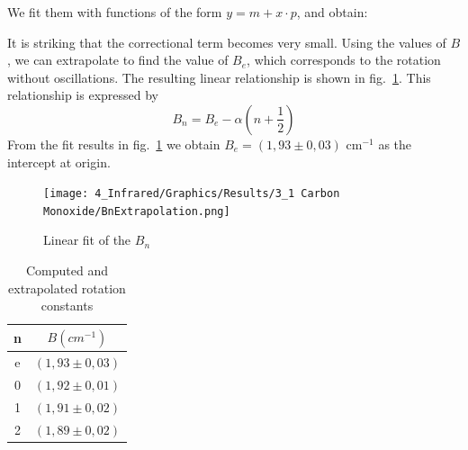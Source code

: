 \documentclass[12pt]{article}
\begin{document}
We fit them with functions of the form $y = m + x \cdot p$, and obtain:
\begin{table}[!ht]
    \centering
    \caption{Values obtained from the linear fits}
    \label{tab:NuLinearFitValues}
\end{table}
\FloatBarrier

It is striking that the correctional term becomes very small. Using the values of $B$, we can extrapolate to find the value of $B_e$, which corresponds to the rotation without oscillations. The resulting linear relationship is shown in fig.~\ref{fig:BnExtrapolation}. This relationship is expressed by
\begin{equation}
    B_n = B_e - \alpha \left( n + \frac{1}{2} \right)
\end{equation}
From the fit results in fig.~\ref{fig:BnExtrapolation} we obtain $B_e = ( 1,93 \pm 0,03 )$ cm$^{-1}$ as the intercept at origin.

\begin{figure}[!ht]
    \centering
    \texttt{[image: 4\_Infrared/Graphics/Results/3\_1 Carbon Monoxide/BnExtrapolation.png]}
    \caption{Linear fit of the $B_n$}
    \label{fig:BnExtrapolation}
\end{figure}
\FloatBarrier

\begin{table}[!ht]
    \centering
    \begin{tabular}{|c|c|}
    \hline
        n & $B (\si{cm^{-1}})$ \\ \hline \hline
        e & $(1,93 \pm 0,03)$ \\ \hline
        0 & $(1,92 \pm 0,01)$ \\ \hline
        1 & $(1,91 \pm 0,02)$ \\ \hline
        2 & $(1,89 \pm 0,02)$ \\ \hline
    \end{tabular}
    \caption{Computed and extrapolated rotation constants}
    \label{tab:BnValues}
\end{table}
\end{document}
